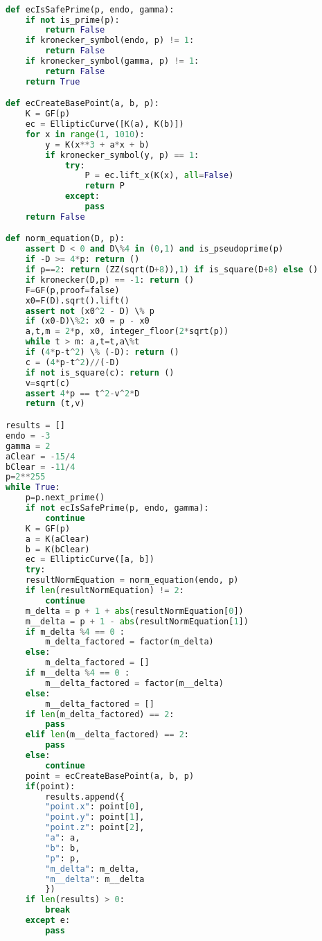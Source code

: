 \begin{lstlisting}[language=python]

def ecIsSafePrime(p, endo, gamma):
    if not is_prime(p):
        return False
    if kronecker_symbol(endo, p) != 1:
        return False
    if kronecker_symbol(gamma, p) != 1:
        return False
    return True

def ecCreateBasePoint(a, b, p):
    K = GF(p)
    ec = EllipticCurve([K(a), K(b)])
    for x in range(1, 1010):
        y = K(x**3 + a*x + b)
        if kronecker_symbol(y, p) == 1:
            try:
                P = ec.lift_x(K(x), all=False)
                return P
            except: 
                pass
    return False

def norm_equation(D, p):
    assert D < 0 and D\%4 in (0,1) and is_pseudoprime(p)
    if -D >= 4*p: return ()
    if p==2: return (ZZ(sqrt(D+8)),1) if is_square(D+8) else ()
    if kronecker(D,p) == -1: return ()
    F=GF(p,proof=false)
    x0=F(D).sqrt().lift()
    assert not (x0^2 - D) \% p 
    if (x0-D)\%2: x0 = p - x0
    a,t,m = 2*p, x0, integer_floor(2*sqrt(p))
    while t > m: a,t=t,a\%t
    if (4*p-t^2) \% (-D): return ()
    c = (4*p-t^2)//(-D)
    if not is_square(c): return ()
    v=sqrt(c)
    assert 4*p == t^2-v^2*D
    return (t,v)

results = []
endo = -3
gamma = 2
aClear = -15/4
bClear = -11/4
p=2**255 
while True:
    p=p.next_prime()
    if not ecIsSafePrime(p, endo, gamma):
        continue
    K = GF(p)
    a = K(aClear)
    b = K(bClear)
    ec = EllipticCurve([a, b])
    try:
    resultNormEquation = norm_equation(endo, p)
    if len(resultNormEquation) != 2:
        continue
    m_delta = p + 1 + abs(resultNormEquation[0])
    m__delta = p + 1 - abs(resultNormEquation[1])
    if m_delta %4 == 0 :
        m_delta_factored = factor(m_delta)
    else:
        m_delta_factored = []
    if m__delta %4 == 0 :
        m__delta_factored = factor(m__delta)
    else:
        m__delta_factored = []
    if len(m_delta_factored) == 2:
        pass
    elif len(m__delta_factored) == 2:
        pass
    else:
        continue
    point = ecCreateBasePoint(a, b, p)
    if(point):
        results.append({
        "point.x": point[0],
        "point.y": point[1],
        "point.z": point[2],
        "a": a,
        "b": b,
        "p": p,
        "m_delta": m_delta,
        "m__delta": m__delta
        })
    if len(results) > 0:
        break
    except e:
        pass

\end{lstlisting}